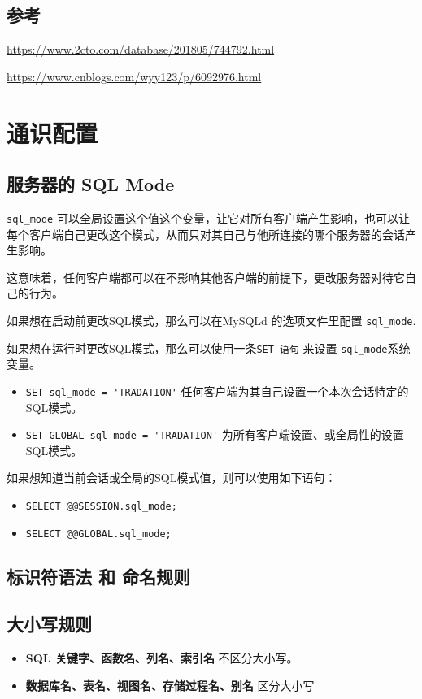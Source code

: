 \documentclass[UTF8,a4paper,12pt]{ctexbook}
\begin{document}
		
		
		\subsection{参考}	
			\url{https://www.2cto.com/database/201805/744792.html}
			
			\url{https://www.cnblogs.com/wyy123/p/6092976.html}	
	
	

		
	 \section{通识配置}	
	 	\subsection{服务器的 SQL Mode}
	 		\verb|sql_mode| 可以全局设置这个值这个变量，让它对所有客户端产生影响，也可以让每个客户端自己更改这个模式，从而只对其自己与他所连接的哪个服务器的会话产生影响。
	 		
	 		这意味着，任何客户端都可以在不影响其他客户端的前提下，更改服务器对待它自己的行为。
	 		
	 		如果想在启动前更改SQL模式，那么可以在MySQLd 的选项文件里配置 \verb|sql_mode|.
	 		
	 		如果想在运行时更改SQL模式，那么可以使用一条\verb|SET 语句| 来设置 \verb|sql_mode|系统变量。
	 		\begin{itemize}
	 			\item \verb|SET sql_mode = 'TRADATION'| 任何客户端为其自己设置一个本次会话特定的SQL模式。
	 			\item \verb|SET GLOBAL sql_mode = 'TRADATION'|	为所有客户端设置、或全局性的设置 SQL模式。
	 		\end{itemize}
	 		
	 		如果想知道当前会话或全局的SQL模式值，则可以使用如下语句：
	 		\begin{itemize}
	 			\item \verb|SELECT @@SESSION.sql_mode;|
	 			\item \verb|SELECT @@GLOBAL.sql_mode;|
	 		\end{itemize}
	 		
	 	\subsection{标识符语法 和 命名规则}
	 	
	 	
	 	\subsection{大小写规则}
	 		\begin{itemize}
	 			\item \textbf{SQL 关键字、函数名、列名、索引名} 不区分大小写。
	 			\item \textbf{数据库名、表名、视图名、存储过程名、别名}  区分大小写
	 		\end{itemize}
	 	
\end{document}
